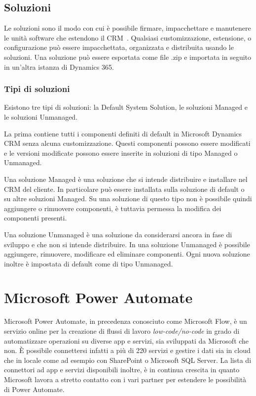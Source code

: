 \subsection{Soluzioni}
Le soluzioni sono il modo con cui è possibile firmare, impacchettare e manutenere le unità software che estendono il CRM~\cite{Solutions}. Qualsiasi customizzazione, estensione, o configurazione può essere impacchettata, organizzata e distribuita usando le soluzioni. Una soluzione può essere esportata come file .zip e importata in seguito in un'altra istanza di Dynamics 365. 
\subsubsection{Tipi di soluzioni}
Esistono tre tipi di soluzioni: la Default System Solution, le soluzioni Managed e le soluzioni Unmanaged.

La prima contiene tutti i componenti definiti di default in Microsoft Dynamics CRM senza alcuna customizzazione. Questi componenti possono essere modificati e le versioni modificate possono essere inserite in soluzioni di tipo Managed o Unmanaged.

Una soluzione Managed è una soluzione che si intende distribuire e installare nel CRM del cliente. In particolare può essere installata sulla soluzione di default o su altre soluzioni Managed. Su una soluzione di questo tipo non è possibile quindi aggiungere o rimuovere componenti, è tuttavia permessa la modifica dei componenti presenti.

Una soluzione Unmanaged è una soluzione da considerarsi ancora in fase di sviluppo e che non si intende distribuire. In una soluzione Unmanaged è possibile aggiungere, rimuovere, modificare ed eliminare componenti. Ogni nuova soluzione inoltre è impostata di default come di tipo Unmanaged.

\section{Microsoft Power Automate}
Microsoft Power Automate, in precedenza conosciuto come Microsoft Flow, è un servizio online per la creazione di flussi di lavoro \textit{low-code/no-code} in grado di automatizzare operazioni su diverse app e servizi, sia sviluppati da Microsoft che non.
È possibile connettersi infatti a più di 220 servizi e gestire i dati sia in cloud che in locale come ad esempio con SharePoint o Microsoft SQL Server. La lista di connettori ad app e servizi disponibili inoltre, è in continua crescita in quanto Microsoft lavora a stretto contatto con i vari partner per estendere le possibilità di Power Automate.

